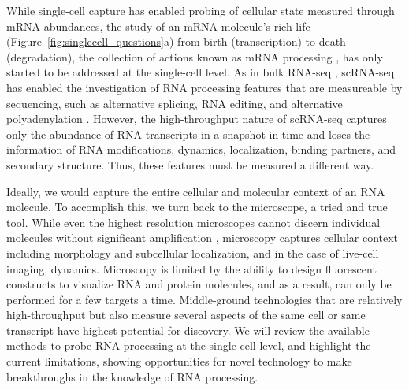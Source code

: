 While single-cell capture has enabled probing of cellular state measured through mRNA abundances, the study of an mRNA molecule’s rich life (Figure~\ref{fig:singlecell_questions}a) from birth (transcription) to death (degradation), the collection of actions known as mRNA processing \cite{Blanc2003-wk,Gerstberger:2014bx,Yeo:2016vz,Nussbacher:2015cwa,Singh:2015jg}, has only started to be addressed at the single-cell level. As in bulk RNA-seq \cite{Anders:2012esa,Kleinman:2012cu,Lianoglou:2013gw,Nishikura2010-dk,Park:2012hz,Peng2012-ru,Shen:2014gs,Wang:2008gt}, scRNA-seq has enabled the investigation of RNA processing features that are measureable by sequencing, such as alternative splicing, RNA editing, and alternative polyadenylation \cite{Karlsson2017-wy,Marinov2014-iw,Picardi2017-bv,Shalek2013-ez,Velten:2015ie,Welch:2016iz}. However, the high-throughput nature of scRNA-seq captures only the abundance of RNA transcripts in a snapshot in time and loses the information of RNA modifications, dynamics, localization, binding partners, and secondary structure. Thus, these features must be measured a different way.

Ideally, we would capture the entire cellular and molecular context of an RNA molecule. To accomplish this, we turn back to the microscope, a tried and true tool. While even the highest resolution microscopes cannot discern individual molecules without significant amplification \cite{Femino1998-ws,Raj2009-ni}, microscopy captures cellular context including morphology and subcellular localization, and in the case of live-cell imaging, dynamics. Microscopy is limited by the ability to design fluorescent constructs to visualize RNA and protein molecules, and as a result, can only be performed for a few targets a time. Middle-ground technologies that are relatively high-throughput but also measure several aspects of the same cell or same transcript \cite{Gierahn2017-ko,Macaulay2017-tb} have highest potential for discovery.
We will review the available methods to probe RNA processing at the single cell level, and highlight the current limitations, showing opportunities for novel technology to make breakthroughs in the knowledge of RNA processing.

